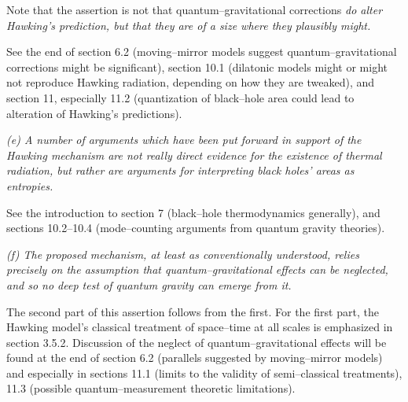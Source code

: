 Note that the assertion is not that quantum--gravitational corrections \it do
\rm alter Hawking's prediction, but that they are of a size where they plausibly
\it might.  \rm

See the end of section 6.2 (moving--mirror models
suggest quantum--gravitational corrections might be significant),
section 10.1 (dilatonic models might or might not reproduce Hawking radiation,
depending on how they are tweaked), and section 11, especially 11.2
(quantization of black--hole area could lead to alteration of Hawking's
predictions).

\smallskip
\it (e) A number of arguments which have been put forward in support
of the Hawking mechanism are not really direct evidence for the
existence of thermal radiation, but rather are arguments for
interpreting black holes' areas as entropies.  \rm

See the introduction to section 7 (black--hole thermodynamics generally),  and
sections 10.2--10.4 (mode--counting arguments from quantum gravity theories).

\smallskip
\it (f) The proposed mechanism, at least as conventionally understood,
relies precisely on the assumption that quantum--gravitational effects
can be neglected, and so no deep test of quantum gravity can emerge
from it.  \rm

The second part of this assertion follows from
the first.  For the first part, the Hawking model's classical
treatment of space--time at all scales is emphasized in section
3.5.2.  Discussion of the neglect of quantum--gravitational effects
will be found at the end of section
6.2 (parallels suggested by moving--mirror models)
and especially in sections 11.1 (limits to the validity of semi--classical 
treatments), 11.3 (possible quantum--measurement theoretic limitations).








